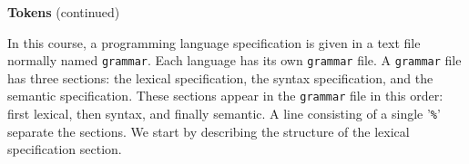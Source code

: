 \begin{minipage}[t]{\sw}
\slidenumber
\LARGE
{\bf Tokens} (continued)\exx
\centerline{}
In this course, a programming language specification
is given in a text file normally named \verb'grammar'.
Each language has its own \verb'grammar' file.
A \verb'grammar' file has three sections:
the lexical specification,
the syntax specification,
and the semantic specification.
These sections appear in the \verb'grammar' file in this order:
first lexical, then syntax, and finally semantic.
A line consisting of a single '\verb'%'' separate the sections.\exx
We start by describing the structure
of the lexical specification section.
\end{minipage}
\clearpage
